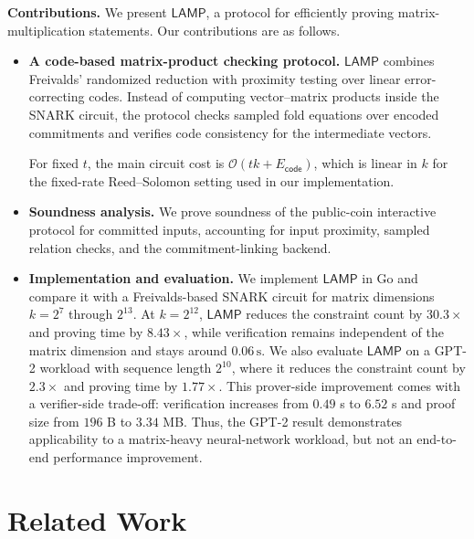 \documentclass[conference,compsoc]{IEEEtran}
\newcommand{\protocol}{\textsf{LAMP}}   %
\theoremstyle{plain}
\theoremstyle{definition}
\theoremstyle{remark}
\providecommand{\DIFaddtex}[1]{{\protect\color{DIFADD} \sf #1}} %
\providecommand{\DIFaddbegin}{} %
\providecommand{\DIFaddend}{} %
\providecommand{\DIFadd}[1]{\texorpdfstring{\DIFaddtex{#1}}{#1}} %
\providecommand{\DIFaddincludegraphics}[2][]{{\color{blue}\fbox{\DIFOincludegraphics[#1]{#2}}}} %
\DeclareRobustCommand{\DIFaddbegin}{\DIFOaddbegin \let\includegraphics\DIFaddincludegraphics} %
\DeclareRobustCommand{\DIFaddend}{\DIFOaddend \let\includegraphics\DIFOincludegraphics} %
\begin{document}
\noindent\textbf{Contributions.}
We present \(\protocol\), a protocol for efficiently proving
matrix-multiplication statements.  Our contributions are as follows.
\begin{itemize}
  \item \textbf{A code-based matrix-product checking protocol.}
  \(\protocol\) combines Freivalds' randomized reduction with proximity testing
  over linear error-correcting codes.  Instead of computing vector--matrix
  products inside the SNARK circuit, the protocol checks sampled fold equations
  over encoded commitments and verifies code consistency for the intermediate
  vectors. 

  For fixed \(t\), the main circuit cost is
  \(\mathcal{O}(tk+E_{\mathsf{code}})\), which is linear in \(k\) for the
  fixed-rate Reed--Solomon setting used in our implementation.

  \item \textbf{Soundness analysis.}
  We prove soundness  \DIFaddbegin \DIFadd{of the public-coin interactive protocol for committed
  inputs, accounting for input proximity, sampled relation checks, and the
  commitment-linking backend}\DIFaddend .

  \item \textbf{Implementation and evaluation.}
  We implement \(\protocol\) in Go and compare it with a Freivalds-based SNARK
  circuit for matrix dimensions \(k=2^7\) through \(2^{13}\).  At
\(k=2^{12}\), \(\protocol\) reduces the constraint count by \(30.3\times\)
and proving time by \(8.43\times\), while verification remains independent of
the matrix dimension and stays around \(0.06\,\text{s}\).  We also evaluate
  \(\protocol\) on a GPT-2 workload with sequence length \(2^{10}\), where it
  reduces the constraint count by \(2.3\times\) and proving time by
   \DIFaddbegin \DIFadd{\(1.77\times\).  This prover-side improvement comes with a verifier-side
  trade-off: verification increases from \(0.49\) s to \(6.52\) s and proof
  size from \(196\) B to \(3.34\) MB.  Thus, the GPT-2 result demonstrates
  applicability to a }\DIFaddend matrix-heavy neural-network  \DIFaddbegin \DIFadd{workload, but not an
  end-to-end performance improvement}\DIFaddend .
\end{itemize}



\section{Related Work}
\label{sec:related}
\end{document}
